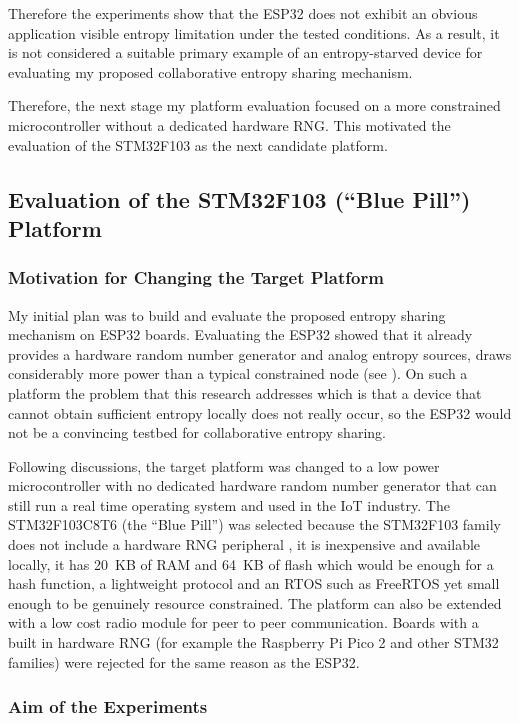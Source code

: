 \documentclass[a4paper, 12pt]{article}
\begin{document}
Therefore the experiments show that the ESP32 does not exhibit an obvious
application visible entropy limitation under the tested conditions. As a
result, it is not considered a suitable primary example of an entropy-starved
device for evaluating my proposed collaborative entropy sharing mechanism.


Therefore, the next stage my platform evaluation focused on a more
constrained microcontroller without a dedicated hardware RNG. This
motivated the evaluation of the STM32F103 as the next candidate platform.

\subsection{Evaluation of the STM32F103 (``Blue Pill'') Platform}
 
\subsubsection{Motivation for Changing the Target Platform}
 
My initial plan was to build and evaluate the proposed entropy sharing mechanism on ESP32 boards. Evaluating the ESP32 showed that it already provides a hardware random number generator and analog entropy sources, draws considerably more power than a typical constrained node (see \citet{espressif2026rng}). On such a platform the problem that this research addresses which is that a device that cannot obtain sufficient entropy locally does not really occur, so the ESP32 would not be a convincing testbed for collaborative entropy sharing.

 
Following discussions, the target platform was changed to a low power microcontroller with no dedicated hardware random number generator that can still run a real time operating system and used in the IoT industry. The STM32F103C8T6 (the ``Blue Pill'') was selected because the STM32F103 family does not include a hardware RNG peripheral \citep{st2021rm0008}, it is inexpensive and available locally, it has 20~KB of RAM and 64~KB of flash which would be enough for a hash function, a lightweight protocol and an RTOS such as FreeRTOS yet small enough to be genuinely resource constrained. The platform can also be extended with a low cost radio module for peer to peer communication. Boards with a built in hardware RNG (for example the Raspberry Pi Pico 2 and other STM32 families) were rejected for the same reason as the ESP32.
 
\subsubsection{Aim of the Experiments}
 
\end{document}
